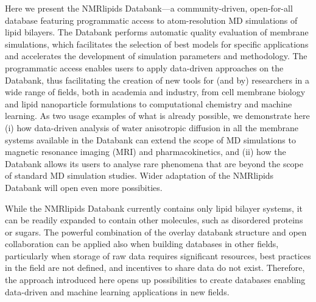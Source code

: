 \documentclass[fleqn,10pt]{wlscirep}
\begin{document}
Here we present the NMRlipids Databank---a community-driven, open-for-all database featuring programmatic access to atom-resolution MD simulations of lipid bilayers. The Databank performs automatic quality evaluation of membrane simulations, which facilitates the selection of best models for specific applications and accelerates the development of simulation parameters and methodology. The programmatic access enables users to apply data-driven approaches on the Databank, thus facilitating the creation of new tools for (and by) researchers in a wide range of fields, both in academia and industry, from cell membrane biology and lipid nanoparticle formulations to computational chemistry and machine learning. As two usage examples of what is already possible, we demonstrate here (i) how data-driven analysis of water anisotropic diffusion in all the membrane systems available in the Databank can extend the scope of MD simulations to magnetic resonance imaging (MRI) and pharmacokinetics, and (ii) how the Databank allows its users to analyse rare phenomena that are beyond the scope of standard MD simulation studies. Wider adaptation of the NMRlipids Databank will open even more possibities. 

While the NMRlipids Databank currently contains only lipid bilayer systems, it can be readily expanded to contain other molecules, such as disordered proteins or sugars. 
The powerful combination of the overlay databank structure and open collaboration can be applied also when building databases in other fields,  
particularly when storage of raw data requires significant resources, best practices in the field are not defined, and incentives to share data do not exist.
Therefore, the approach introduced here opens up possibilities to create databases enabling data-driven and machine learning applications in new fields.



\end{document}
